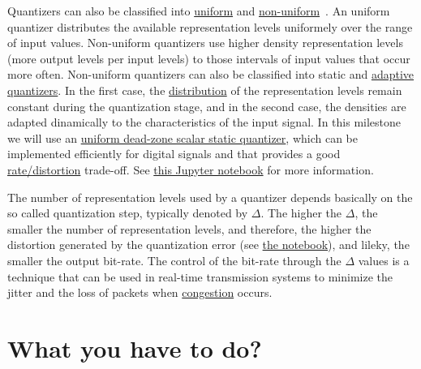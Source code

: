 Quantizers can also be classified into
\href{https://en.wikipedia.org/wiki/Quantization_(signal_processing)#Mid-riser_and_mid-tread_uniform_quantizers}{uniform}
and
\href{https://nptel.ac.in/content/storage2/courses/117104069/chapter_5/5_5.html}{non-uniform}~\cite{sayood2017introduction,vetterli2014foundations}. An
uniform quantizer distributes the available representation levels
uniformely over the range of input values. Non-uniform quantizers use
higher density representation levels (more output levels per input
levels) to those intervals of input values that occur
more often. Non-uniform quantizers can also be classified into static
and
\href{https://en.wikipedia.org/wiki/Adaptive_differential_pulse-code_modulation}{adaptive
  quantizers}. In the first case, the
\href{https://en.wikipedia.org/wiki/Probability_distribution}{distribution}
of the representation levels remain constant during the quantization
stage, and in the second case, the densities are adapted dinamically
to the characteristics of the input signal. In this milestone we will
use an
\href{https://en.wikipedia.org/wiki/Quantization_(signal_processing)#Dead-zone_quantizers}{uniform
  dead-zone scalar static quantizer}, which can be implemented
efficiently for digital signals and that provides a good
\href{https://en.wikipedia.org/wiki/Rate%E2%80%93distortion_theory}{rate/distortion}
trade-off. See \href{https://github.com/vicente-gonzalez-ruiz/quantization/blob/master/digital_quantization.ipynb}{this Jupyter notebook} for more information.

The number of representation levels used by a quantizer depends
basically on the so called quantization step, typically denoted by
$\Delta$. The higher the $\Delta$, the smaller the number of
representation levels, and therefore, the higher the distortion
generated by the quantization error (see
\href{https://github.com/vicente-gonzalez-ruiz/quantization/blob/master/digital_quantization.ipynb}{the
  notebook}), and lileky, the smaller the output bit-rate. The control
of the bit-rate through the $\Delta$ values is a technique that can be
used in real-time transmission systems to minimize the jitter and the
loss of packets when
\href{https://en.wikipedia.org/wiki/Network_congestion}{congestion}
occurs.

\section{What you have to do?}

